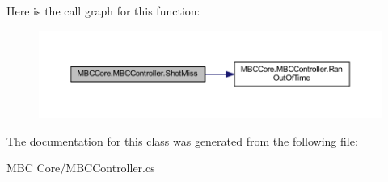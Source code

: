 Here is the call graph for this function\-:\nopagebreak
\begin{figure}[H]
\begin{center}
\leavevmode
\includegraphics[width=350pt]{class_m_b_c_core_1_1_m_b_c_controller_ac155df683003b696508b059a651c151b_cgraph}
\end{center}
\end{figure}




The documentation for this class was generated from the following file\-:\begin{DoxyCompactItemize}
\item 
M\-B\-C Core/M\-B\-C\-Controller.\-cs\end{DoxyCompactItemize}
